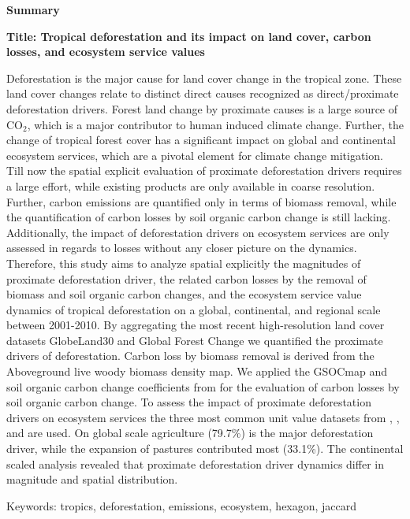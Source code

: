 \thispagestyle{empty}

\begin{center}
	\textbf{Summary}
\end{center}
	\textbf{Title: Tropical deforestation and its impact on land cover, carbon losses, and ecosystem service values}

	Deforestation is the major cause for land cover change in the tropical zone. These land cover changes relate to distinct direct causes recognized as direct/proximate deforestation drivers. Forest land change by proximate causes is a large source of CO$_2$, which is a major contributor to human induced climate change. Further, the change of tropical forest cover has a significant impact on global and continental ecosystem services, which are a pivotal element for climate change mitigation. Till now the spatial explicit evaluation of proximate deforestation drivers requires a large effort, while existing products are only available in coarse resolution. Further, carbon emissions are quantified only in terms of biomass removal, while the quantification of carbon losses by soil organic carbon change is still lacking. Additionally, the impact of deforestation drivers on ecosystem services are only assessed in regards to losses without any closer picture on the dynamics. Therefore, this study aims to analyze spatial explicitly the magnitudes of proximate deforestation driver, the related carbon losses by the removal of biomass and soil organic carbon changes, and the ecosystem service value dynamics of tropical deforestation on a global, continental, and regional scale between 2001-2010. By aggregating the most recent high-resolution land cover datasets GlobeLand30 and Global Forest Change we quantified the proximate drivers of deforestation. Carbon loss by biomass removal is derived from the Aboveground live woody biomass density map. We applied the GSOCmap and soil organic carbon change coefficients from \citet{Don2010} for the evaluation of carbon losses by soil organic carbon change. To assess the impact of proximate deforestation drivers on ecosystem services the three most common unit value datasets from \citet{Costanza2014}, \citet{Groot2012}, and \citet{Siikamaki2015} are used. On global scale agriculture (79.7\%) is the major deforestation driver, while the expansion of pastures contributed most (33.1\%). The continental scaled analysis revealed that proximate deforestation driver dynamics differ in magnitude and spatial distribution.

	Keywords: tropics, deforestation, emissions, ecosystem, hexagon, jaccard